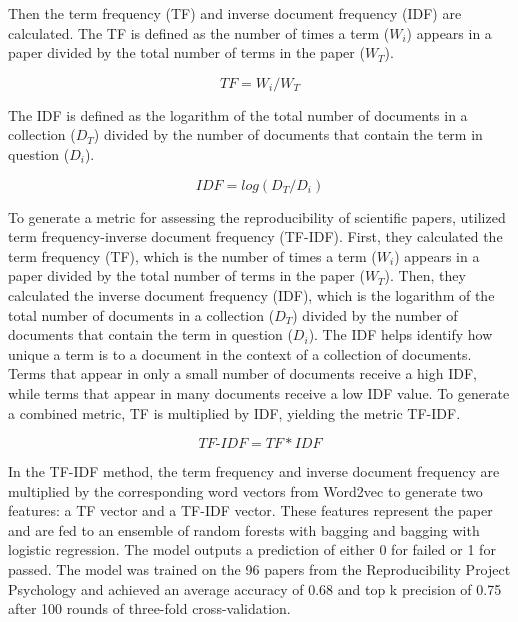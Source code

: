 \documentclass[12pt, a4paper, twocolumn]{article}
\begin{document}
			Then the term frequency (TF) and inverse document frequency (IDF) are calculated. The TF is defined as the number of times a term ($W_{i}$) appears in a paper divided by the total number of terms in the paper ($W_{T}$).

			\begin{equation}  
				TF = W_{i}/W_{T}              
			\end{equation}			

			\noindent The IDF is defined as the logarithm of the total number of documents in a collection ($D_{T}$) divided by the number of documents that contain the term in question ($D_{i}$).  

			\begin{equation}
				IDF = log(D_{T}/D_{i})
			\end{equation}
			
			\noindent To generate a metric for assessing the reproducibility of scientific papers, \citet{Yang2020estimating} utilized term frequency-inverse document frequency (TF-IDF). First, they calculated the term frequency (TF), which is the number of times a term ($W_{i}$) appears in a paper divided by the total number of terms in the paper ($W_{T}$). Then, they calculated the inverse document frequency (IDF), which is the logarithm of the total number of documents in a collection ($D_{T}$) divided by the number of documents that contain the term in question ($D_{i}$). The IDF helps identify how unique a term is to a document in the context of a collection of documents. Terms that appear in only a small number of documents receive a high IDF, while terms that appear in many documents receive a low IDF value. To generate a combined metric, TF is multiplied by IDF, yielding the metric TF-IDF.

			\begin{equation}
				\textit{TF-IDF} = TF * IDF
			\end{equation}

			In the TF-IDF method, the term frequency and inverse document frequency are multiplied by the corresponding word vectors from Word2vec to generate two features: a TF vector and a TF-IDF vector. These features represent the paper and are fed to an ensemble of random forests with bagging and bagging with logistic regression. The model outputs a prediction of either 0 for failed or 1 for passed. The model was trained on the 96 papers from the Reproducibility Project Psychology and achieved an average accuracy of 0.68 and top k precision of 0.75 after 100 rounds of three-fold cross-validation.
\end{document}
